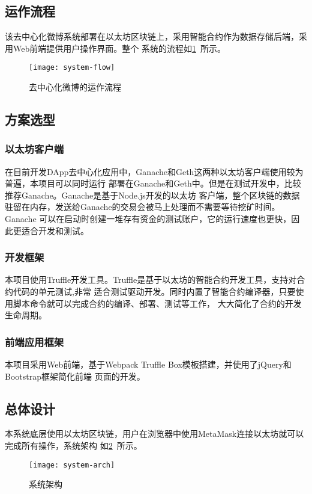 \documentclass[bwprint]{hfutreport}
\begin{document}
\subsection{运作流程}
该去中心化微博系统部署在以太坊区块链上，采用智能合约作为数据存储后端，采用Web前端提供用户操作界面。整个
系统的流程如\cref{fig:system-flow}~所示。

\begin{figure}[!htbp]
    \texttt{[image: system-flow]}
    \caption{去中心化微博的运作流程}
    \label{fig:system-flow}
\end{figure}

\subsection{方案选型}
\subsubsection{以太坊客户端}
在目前开发DApp去中心化应用中，Ganache和Geth这两种以太坊客户端使用较为普遍，本项目可以同时运行
部署在Ganache和Geth中。但是在测试开发中，比较推荐Ganache。Ganache是基于Node.js开发的以太坊
客户端，整个区块链的数据驻留在内存，发送给Ganache的交易会被马上处理而不需要等待挖矿时间。Ganache
可以在启动时创建一堆存有资金的测试账户，它的运行速度也更快，因此更适合开发和测试。

\subsubsection{开发框架}
本项目使用Truffle开发工具。Truffle是基于以太坊的智能合约开发工具，支持对合约代码的单元测试,非常
适合测试驱动开发。同时内置了智能合约编译器，只要使用脚本命令就可以完成合约的编译、部署、测试等工作，
大大简化了合约的开发生命周期。

\subsubsection{前端应用框架}
本项目采用Web前端，基于Webpack Truffle Box模板搭建，并使用了jQuery和Bootstrap框架简化前端
页面的开发。

\subsection{总体设计}
本系统底层使用以太坊区块链，用户在浏览器中使用MetaMask连接以太坊就可以完成所有操作，系统架构
如\cref{fig:system-arch}~所示。

\begin{figure}[!htbp]
    \texttt{[image: system-arch]}
    \caption{系统架构}
    \label{fig:system-arch}
\end{figure}
\end{document}
